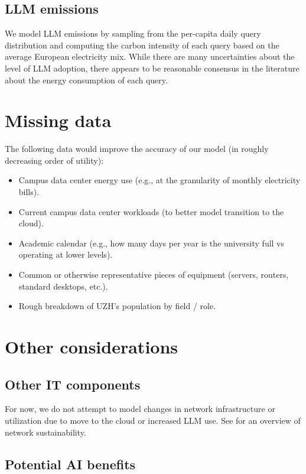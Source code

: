 \documentclass[11pt]{article}
\begin{document}
\subsection{LLM emissions}

We model LLM emissions by sampling from the per-capita daily query distribution and computing
the carbon intensity of each query based on the average European electricity mix. While there 
are many uncertainties about the level of LLM adoption, there appears to be reasonable consensus
in the literature about the energy consumption of each query.

\section{Missing data}

The following data would improve the accuracy of our model (in roughly decreasing order of utility):
\begin{itemize}
    \item Campus data center energy use (e.g., at the granularity of monthly electricity bills).
    \item Current campus data center workloads (to better model transition to the cloud).
    \item Academic calendar (e.g., how many days per year is the university full vs operating
        at lower levels).
    \item Common or otherwise representative pieces of equipment (servers, routers, standard desktops, etc.).
    \item Rough breakdown of UZH's population by field / role.
\end{itemize}

\section{Other considerations}

\subsection{Other IT components}

For now, we do not attempt to model changes in network infrastructure or utilization due to
move to the cloud or increased LLM use. See \textcite{jacob2023} for an overview of
network sustainability.

\subsection{Potential AI benefits}
\end{document}
